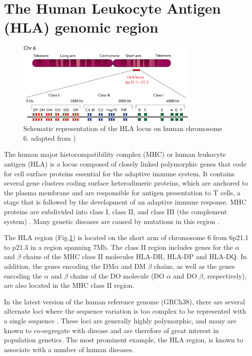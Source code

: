 \section{The Human Leukocyte Antigen (HLA) genomic region}

\begin{figure}[H]
\centering
\includegraphics[width=0.80\textwidth]{fig/HLA_loci.png}
\decoRule
\caption{Schematic representation of the HLA locus on human chromosome 6. adapted from \cite{zakharova2019contribution})}
\label{fig:HLA.png}
\end{figure}

The human major histocompatibility complex (MHC) or human leukocyte antigen (HLA) is a locus composed of closely linked polymorphic genes that code for cell surface proteins essential for the adaptive immune system. It contains several gene clusters coding surface heterodimeric proteins, which are anchored to the plasma membrane and are responsible for antigen presentation to T cells, a stage that is followed by the development of an adaptive immune response. MHC proteins are subdivided into class I, class II, and class III (the complement system) \cite{campbell1993map}. Many genetic diseases are caused by mutations in this region \cite{tiwari2012hla}.  


The HLA region (Fig.\ref{fig:HLA.png}) is located on the short arm of chromosome 6 from 6p21.1 to p21.3 in a region spanning 7Mb. The class II region includes genes for the $\alpha$ and $\beta$ chains of the MHC class II molecules HLA-DR, HLA-DP and HLA-DQ. In addition, the genes encoding the DM$\alpha$ and DM $\beta$ chains, as well as the genes encoding the $\alpha$ and $\beta$ chains of the DO molecule (DO $\alpha$ and DO $\beta$, respectively), are also located in the MHC class II region.

In the latest version of the human reference genome (GRCh38), there are several alternate loci where the sequence variation is too complex to be represented with a single sequence \cite{eggertsson2017graphtyper}. These loci are generally highly polymorphic, and many are known to co-segregate with disease and are therefore of great interest in population genetics. The most prominent example, the HLA region, is known to associate with a number of human diseases. 

